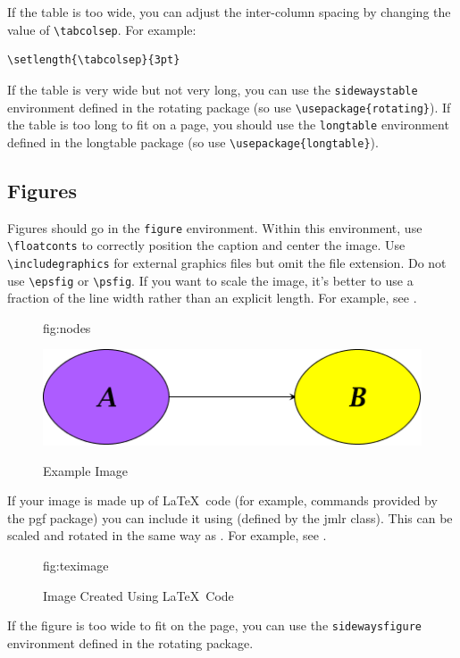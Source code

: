 \documentclass[pmlr]{jmlr}
\begin{document}
If the table is too wide, you can adjust the inter-column
spacing by changing the value of \verb|\tabcolsep|. For
example:
\begin{verbatim}
\setlength{\tabcolsep}{3pt}
\end{verbatim}
If the table is very wide but not very long, you can use the
\texttt{sidewaystable} environment defined in the
\textsf{rotating} package (so use \verb|\usepackage{rotating}|).
If the table is too long to fit on a page, you should use the
\texttt{longtable} environment defined in the \textsf{longtable}
package (so use \verb|\usepackage{longtable}|).

\subsection{Figures}
\label{sec:figures}

Figures should go in the \texttt{figure} environment. Within this
environment, use \verb|\floatconts| to correctly position the
caption and center the image. Use \verb|\includegraphics|
for external graphics files but omit the file extension. Do not
use \verb|\epsfig| or \verb|\psfig|. If you want to scale the
image, it's better to use a fraction of the line width rather
than an explicit length. For example, see .

\begin{figure}[htbp]
\floatconts
  {fig:nodes}
  {\caption{Example Image}}
  {\includegraphics[width=0.5\linewidth]{images/nodes}}
\end{figure}

If your image is made up of \LaTeX\ code (for example, commands
provided by the \textsf{pgf} package) you can include it using
 (defined by the \textsf{jmlr} class). This
can be scaled and rotated in the same way as .
For example, see .

\begin{figure}[htbp]
\floatconts
  {fig:teximage}
  {\caption{Image Created Using \LaTeX\ Code}}
  {}
\end{figure}

If the figure is too wide to fit on the page, you can use the
\texttt{sidewaysfigure} environment defined in the
\textsf{rotating} package.
\end{document}
